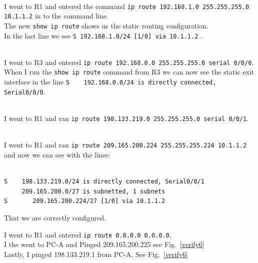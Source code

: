 \documentclass[../EngineeringJournal_CDavis.tex]{subfiles}
\begin{document}
\clearpage

\\
I went to R1 and entered the command 
{\scriptsize{\verb$ip route 192.168.1.0 255.255.255.0 10.1.1.2$}\normalsize} 
in to the command line.\\
The new {\scriptsize{\verb$show ip route$}\normalsize} shows us the static
routing configuration.\\
In the last line  we see {\scriptsize{\verb$S 192.168.1.0/24 [1/0] via 10.1.1.2$}\normalsize} .

\noindent{}\\
I went to R3 and 
entered {\scriptsize{\verb$ip route 192.168.0.0 255.255.255.0 serial 0/0/0$}\normalsize}.\\
When I run the {\scriptsize{\verb$show ip route$}\normalsize} command from R3 we can now see the static exit interface in the line {\scriptsize{\verb$S    192.168.0.0/24 is directly connected, Serial0/0/0$}\normalsize}.


\noindent{}\\
I went to R1 and ran {\scriptsize{\verb$ip route 198.133.219.0 255.255.255.0 serial 0/0/1$}\normalsize}.


\noindent{}\\
I went to R1 and 
ran {\scriptsize{\verb$ip route 209.165.200.224 255.255.255.224 10.1.1.2$}\normalsize}\\
and now we can see with the lines: 
\begin{mdframed}
\scriptsize
\begin{verbatim}

S    198.133.219.0/24 is directly connected, Serial0/0/1
     209.165.200.0/27 is subnetted, 1 subnets
S       209.165.200.224/27 [1/0] via 10.1.1.2
\end{verbatim}
\normalsize
\end{mdframed}


That we are correctly configured.

\clearpage

I went to R1 and entered 
{\scriptsize{\verb$ip route 0.0.0.0 0.0.0.0$}\normalsize}.\\
I the went to PC-A and Pinged 209.165.200.225 see
Fig.~\ref{verify6}\\
Lastly, I pinged 198.133.219.1 from PC-A. See Fig.~\ref{verify6}
\end{document}
